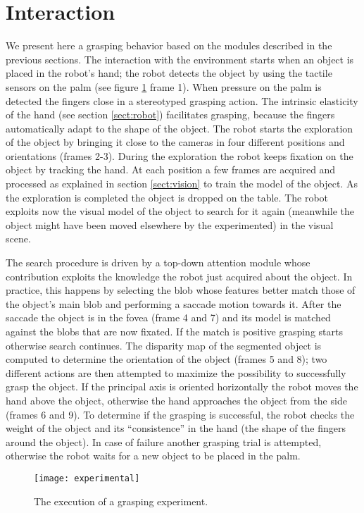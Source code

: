 \section{Interaction}
\label{sect:exp}

We present here a grasping behavior based on the modules described in the previous sections. The interaction with the environment starts when an object is placed in the robot's hand; the robot detects the object by using the tactile sensors on the palm (see figure \ref{fig-experiment} frame 1). When pressure on the palm is detected the fingers close in a stereotyped grasping action. The intrinsic elasticity of the hand (see section \ref{sect:robot}) facilitates grasping, because the fingers automatically adapt to the shape of the object. The robot starts the exploration of the object by bringing it close to the cameras in four different positions and orientations (frames 2-3). During the exploration the robot keeps fixation on the object by tracking the hand. At each position a few frames are acquired and processed as explained in section \ref{sect:vision} to train the model of the object. As the exploration is completed the object is dropped on the table. The robot exploits now the visual model of the object to search for it again (meanwhile the object might have been moved elsewhere by the experimented) in the visual scene. 

The search procedure is driven by a top-down attention module whose contribution exploits the knowledge the robot just acquired about the object. In practice, this happens by selecting the blob whose features better match those of the object's main blob and performing a saccade motion towards it. After the saccade the object is in the fovea (frame 4 and 7) and its model is matched against the blobs that are now fixated. If the match is positive grasping starts otherwise search continues. The disparity map of the segmented object is computed to determine the orientation of the object (frames 5 and 8); two different actions are then attempted to maximize the possibility to successfully grasp the object. If the principal axis is oriented horizontally the robot moves the hand above the object, otherwise the hand approaches the object from the side (frames 6 and 9). To determine if the grasping is successful, the robot checks the weight of the object and its ``consistence'' in the hand (the shape of the fingers around the object). In case of failure another grasping trial is attempted, otherwise the robot waits for a new object to be placed in the palm.

\begin{figure}
\centering
\texttt{[image: experimental]}
\caption{The execution of a grasping experiment.}
\label{fig-experiment}
\end{figure}
